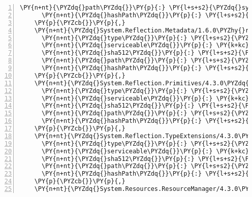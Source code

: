 \begin{Verbatim}[commandchars=\\\{\},numbers=left,firstnumber=1,stepnumber=1,numberblanklines=0]
      \PY{n+nt}{\PYZdq{}path\PYZdq{}}\PY{p}{:} \PY{l+s+s2}{\PYZdq{}system.reflection.extensions/4.3.0\PYZdq{}}\PY{p}{,}
      \PY{n+nt}{\PYZdq{}hashPath\PYZdq{}}\PY{p}{:} \PY{l+s+s2}{\PYZdq{}system.reflection.extensions.4.3.0.nupkg.sha512\PYZdq{}}
    \PY{p}{\PYZcb{}}\PY{p}{,}
    \PY{n+nt}{\PYZdq{}System.Reflection.Metadata/1.6.0\PYZhy{}rc1\PYZdq{}}\PY{p}{:} \PY{p}{\PYZob{}}
      \PY{n+nt}{\PYZdq{}type\PYZdq{}}\PY{p}{:} \PY{l+s+s2}{\PYZdq{}package\PYZdq{}}\PY{p}{,}
      \PY{n+nt}{\PYZdq{}serviceable\PYZdq{}}\PY{p}{:} \PY{k+kc}{true}\PY{p}{,}
      \PY{n+nt}{\PYZdq{}sha512\PYZdq{}}\PY{p}{:} \PY{l+s+s2}{\PYZdq{}sha512\PYZhy{}2CyRcTBm1+aut3yNfs6s3ahPRd8iie7BO3f4AqbIVmOGEQnrPYvHybkC9T38QqlUi7F+8ZuaGaXAesT87R2xAA==\PYZdq{}}\PY{p}{,}
      \PY{n+nt}{\PYZdq{}path\PYZdq{}}\PY{p}{:} \PY{l+s+s2}{\PYZdq{}system.reflection.metadata/1.6.0\PYZhy{}rc1\PYZdq{}}\PY{p}{,}
      \PY{n+nt}{\PYZdq{}hashPath\PYZdq{}}\PY{p}{:} \PY{l+s+s2}{\PYZdq{}system.reflection.metadata.1.6.0\PYZhy{}rc1.nupkg.sha512\PYZdq{}}
    \PY{p}{\PYZcb{}}\PY{p}{,}
    \PY{n+nt}{\PYZdq{}System.Reflection.Primitives/4.3.0\PYZdq{}}\PY{p}{:} \PY{p}{\PYZob{}}
      \PY{n+nt}{\PYZdq{}type\PYZdq{}}\PY{p}{:} \PY{l+s+s2}{\PYZdq{}package\PYZdq{}}\PY{p}{,}
      \PY{n+nt}{\PYZdq{}serviceable\PYZdq{}}\PY{p}{:} \PY{k+kc}{true}\PY{p}{,}
      \PY{n+nt}{\PYZdq{}sha512\PYZdq{}}\PY{p}{:} \PY{l+s+s2}{\PYZdq{}sha512\PYZhy{}5RXItQz5As4xN2/YUDxdpsEkMhvw3e6aNveFXUn4Hl/udNTCNhnKp8lT9fnc3MhvGKh1baak5CovpuQUXHAlIA==\PYZdq{}}\PY{p}{,}
      \PY{n+nt}{\PYZdq{}path\PYZdq{}}\PY{p}{:} \PY{l+s+s2}{\PYZdq{}system.reflection.primitives/4.3.0\PYZdq{}}\PY{p}{,}
      \PY{n+nt}{\PYZdq{}hashPath\PYZdq{}}\PY{p}{:} \PY{l+s+s2}{\PYZdq{}system.reflection.primitives.4.3.0.nupkg.sha512\PYZdq{}}
    \PY{p}{\PYZcb{}}\PY{p}{,}
    \PY{n+nt}{\PYZdq{}System.Reflection.TypeExtensions/4.3.0\PYZdq{}}\PY{p}{:} \PY{p}{\PYZob{}}
      \PY{n+nt}{\PYZdq{}type\PYZdq{}}\PY{p}{:} \PY{l+s+s2}{\PYZdq{}package\PYZdq{}}\PY{p}{,}
      \PY{n+nt}{\PYZdq{}serviceable\PYZdq{}}\PY{p}{:} \PY{k+kc}{true}\PY{p}{,}
      \PY{n+nt}{\PYZdq{}sha512\PYZdq{}}\PY{p}{:} \PY{l+s+s2}{\PYZdq{}sha512\PYZhy{}7u6ulLcZbyxB5Gq0nMkQttcdBTx57ibzw+4IOXEfR+sXYQoHvjW5LTLyNr8O22UIMrqYbchJQJnos4eooYzYJA==\PYZdq{}}\PY{p}{,}
      \PY{n+nt}{\PYZdq{}path\PYZdq{}}\PY{p}{:} \PY{l+s+s2}{\PYZdq{}system.reflection.typeextensions/4.3.0\PYZdq{}}\PY{p}{,}
      \PY{n+nt}{\PYZdq{}hashPath\PYZdq{}}\PY{p}{:} \PY{l+s+s2}{\PYZdq{}system.reflection.typeextensions.4.3.0.nupkg.sha512\PYZdq{}}
    \PY{p}{\PYZcb{}}\PY{p}{,}
    \PY{n+nt}{\PYZdq{}System.Resources.ResourceManager/4.3.0\PYZdq{}}\PY{p}{:} \PY{p}{\PYZob{}}

\end{Verbatim}
